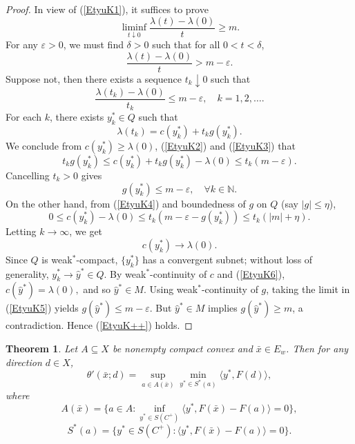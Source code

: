 \documentclass[11pt]{article}
\newtheorem{theorem}{Theorem}[section]
\begin{document}
\begin{proof}
 
In view of     (\ref{EtyuK1}),   it suffices to prove
\begin{equation}  \label{EtyuK++}
	\liminf_{t \downarrow 0} \frac{\lambda(t) - \lambda(0)}{t} \ge m.
	\end{equation}
	For any $\varepsilon > 0$, we must find $\delta > 0$ such that for all $0 < t < \delta$,
	\[
	\frac{\lambda(t) - \lambda(0)}{t} > m - \varepsilon.
	\]
	Suppose not, then there exists a sequence $t_k \downarrow 0$ such that
	\begin{equation}  \label{EtyuK2}
		\frac{\lambda(t_k) - \lambda(0)}{t_k} \le m - \varepsilon, \quad k=1,2,\dots.  
	\end{equation}
	For each $k$,    there exists $y_k^* \in Q$ such that
	\begin{equation}  \label{EtyuK3}
	\lambda (t_k) = c(y_k^*) + t_k g(y_k^*).  
	\end{equation}
	  We conclude from    $c(y_k^*) \ge \lambda(0)$,    (\ref{EtyuK2})  and  (\ref{EtyuK3})  that
 		\begin{equation}  \label{EtyuK4}
 				t_k g(y_k^*) \le c(y_k^*) + t_k g(y_k^*) - \lambda(0) \le t_k (m - \varepsilon).	
 				\end{equation}
	Cancelling $t_k > 0$ gives
	\begin{equation}  \label{EtyuK5}
		g(y_k^*) \le m - \varepsilon, \quad \forall k   \in \mathbb{N}. 
		\end{equation}
	On the other hand, from (\ref{EtyuK4})  and boundedness of $g$ on $Q$ (say $|g| \le \eta$),
	\[
	0 \le c(y_k^*) - \lambda(0) \le t_k (m - \varepsilon - g(y_k^*)) \le t_k (|m| + \eta).
	\]
	Letting $k \to \infty$, we get
	\begin{equation}  \label{EtyuK6}
		c(y_k^*) \to \lambda(0).  
	\end{equation}
	Since $Q$ is weak$^*$-compact, $\{y_k^*\}$ has a convergent subnet; without loss of generality, $y_k^* \to \hat y^* \in Q$. By weak$^*$-continuity of $c$ and  (\ref{EtyuK6}),
$	c(\hat y^*) = \lambda(0),$
and	so $\hat y^* \in M$. Using weak$^*$-continuity of $g$, taking the limit in (\ref{EtyuK5}) yields
$	g(\hat y^*) \le m - \varepsilon.$
	But $\hat y^* \in M$ implies $g(\hat y^*) \ge m$, a contradiction. Hence  (\ref{EtyuK++}) holds.
\end{proof}

\begin{theorem}  \label{YXDS}
	Let   $A\subseteq X$ be nonempty compact convex  and  $\bar x\in E_w$.  Then for any direction $d\in X$, 
	\[
	\theta'(\bar x;d)=\sup_{a\in A(\bar x)}\min_{y^*\in S^*(a)}\langle y^*,F(d)\rangle,
	\]
	where
	\[
	A(\bar x)=\bigl\{a\in A:\inf_{y^*\in S(C^+)}\langle y^*,F(\bar x)-F(a)\rangle=0\bigr\},
	\]
	\[
	S^*(a)=\bigl\{y^*\in S(C^+):\langle y^*,F(\bar x)-F(a)\rangle=0\bigr\}.
	\]
\end{theorem}
\end{document}
